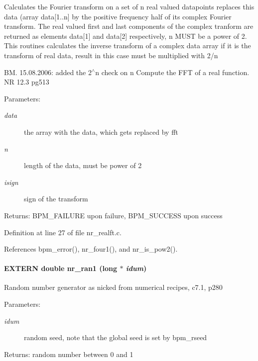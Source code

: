 Calculates the Fourier transform on a set of n real valued datapoints replaces this data (array data[1..n] by the positive frequency half of its complex Fourier transform. The real valued first and last components of the complex tranform are returned as elements data[1] and data[2] respectively, n MUST be a power of 2. This routines calculates the inverse transform of a complex data array if it is the transform of real data, result in this case must be multiplied with 2/n

BM. 15.08.2006: added the 2$^\wedge$n check on n Compute the FFT of a real function. NR 12.3 pg513

\begin{Desc}
\item[Parameters:]
\begin{description}
\item[{\em data}]the array with the data, which gets replaced by fft \item[{\em n}]length of the data, must be power of 2 \item[{\em isign}]sign of the transform\end{description}
\end{Desc}
\begin{Desc}
\item[Returns:]BPM\_\-FAILURE upon failure, BPM\_\-SUCCESS upon success \end{Desc}


Definition at line 27 of file nr\_\-realft.c.

References bpm\_\-error(), nr\_\-four1(), and nr\_\-is\_\-pow2().
\paragraph[nr\_\-ran1]{\setlength{\rightskip}{0pt plus 5cm}EXTERN double nr\_\-ran1 (long $\ast$ {\em idum})}\hfill\label{group__nr_g145c2dac1fb988abba27e2046251faf2}


Random number generator as nicked from numerical recipes, c7.1, p280

\begin{Desc}
\item[Parameters:]
\begin{description}
\item[{\em idum}]random seed, note that the global seed is set by bpm\_\-rseed \end{description}
\end{Desc}
\begin{Desc}
\item[Returns:]random number between 0 and 1 \end{Desc}



